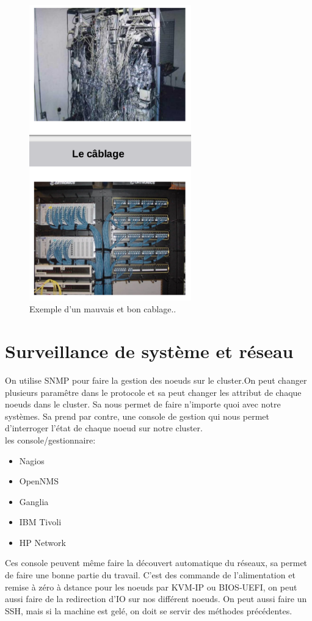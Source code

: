 \documentclass[oneside]{book}
\begin{document}
\begin{figure}[!ht]
\centering
\includegraphics[width = 7cm]{cablage.png}
\caption{Exemple d'un mauvais et bon cablage..}
\end{figure}
\section{Surveillance de système et réseau}
On utilise SNMP pour faire la gestion des noeuds sur le cluster.On peut changer plusieurs paramêtre dans le protocole et sa peut changer les attribut de chaque noeuds dans le cluster. Sa nous permet de faire n'importe quoi avec notre systèmes. Sa prend par contre, une console de gestion qui nous permet d'interroger l'état de chaque noeud sur notre cluster. \\

les console/gestionnaire:
\begin{itemize}
\item Nagios
\item OpenNMS
\item Ganglia
\item IBM Tivoli
\item HP Network
\end{itemize}
Ces console peuvent même faire la découvert automatique du réseaux, sa permet de faire une bonne partie du travail. C'est des commande de l'alimentation et remise à zéro à dstance pour les noeuds par KVM-IP ou BIOS-UEFI, on peut aussi faire de la redirection d'IO sur nos différent noeuds. On peut aussi faire un SSH, mais si la machine est gelé, on doit se servir des méthodes précédentes.\\
\end{document}
